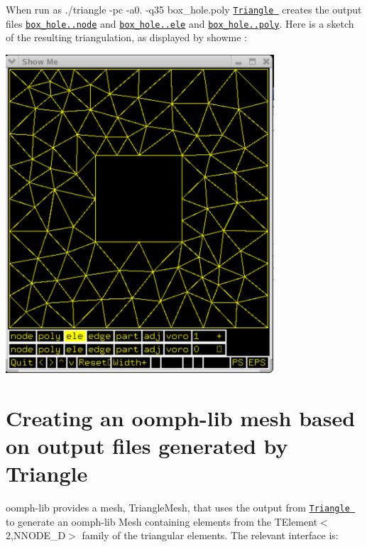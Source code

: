 When run as {\ttfamily  ./triangle -\/pc -\/a0. -\/q35 box\+\_\+hole.\+poly } \href{http://www.cs.cmu.edu/~quake/triangle.html}{\tt {\ttfamily Triangle} } creates the output files \href{../../../../demo_drivers/meshing/mesh_from_triangle/box_hole.1.node}{\tt box\+\_\+hole..\+node} and \href{../../../../demo_drivers/meshing/mesh_from_triangle/box_hole.1.ele}{\tt box\+\_\+hole..\+ele} and \href{../../../../demo_drivers/meshing/mesh_from_triangle/box_hole.1.poly}{\tt box\+\_\+hole..\+poly}. Here is a sketch of the resulting triangulation, as displayed by {\ttfamily showme} \+:

 
\begin{DoxyImage}
\includegraphics[width=0.75\textwidth]{showme_screenshot}
\end{DoxyImage}




 

\hypertarget{index_oomph_use}{}\section{Creating an oomph-\/lib mesh based on output files generated by Triangle}\label{index_oomph_use}
{\ttfamily oomph-\/lib} provides a mesh, {\ttfamily Triangle\+Mesh}, that uses the output from \href{http://www.cs.cmu.edu/~quake/triangle.html}{\tt {\ttfamily Triangle} } to generate an {\ttfamily oomph-\/lib} Mesh containing elements from the {\ttfamily T\+Element$<$2,\+N\+N\+O\+D\+E\+\_\+D$>$} family of the triangular elements. The relevant interface is\+:

